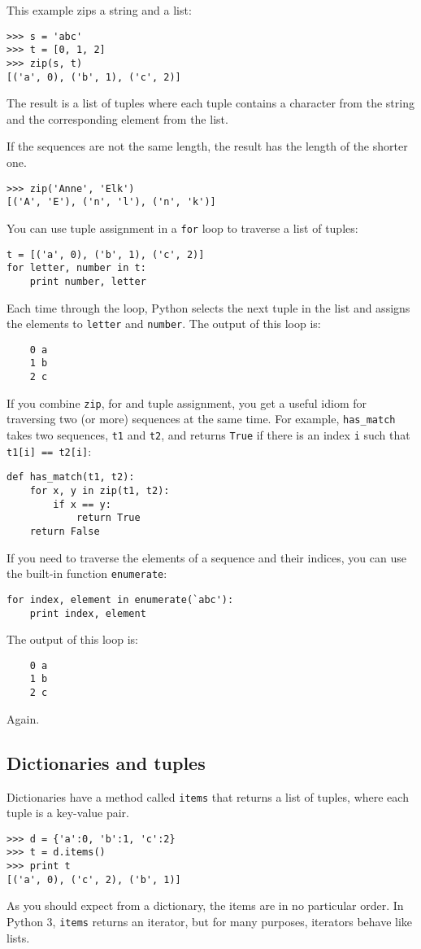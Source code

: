 \documentclass{article}
\begin{document}
This example zips a string and a list:
\begin{verbatim}
>>> s = 'abc'
>>> t = [0, 1, 2]
>>> zip(s, t)
[('a', 0), ('b', 1), ('c', 2)]
\end{verbatim}
The result is a list of tuples where each tuple contains a character
from the string and the corresponding element from the list.

If the sequences are not the same length, the result has the length of
the shorter one.

\begin{verbatim}
>>> zip('Anne', 'Elk')
[('A', 'E'), ('n', 'l'), ('n', 'k')]
\end{verbatim}
You can use tuple assignment in a \verb|for| loop to traverse a list of
tuples:
\begin{verbatim}
t = [('a', 0), ('b', 1), ('c', 2)]
for letter, number in t:
    print number, letter
\end{verbatim}
Each time through the loop, Python selects the next tuple in the
list and assigns the elements to \verb|letter| and \verb|number|.
The output of this loop is:
\begin{verbatim}
    0 a
    1 b
    2 c
\end{verbatim}
If you combine \verb|zip|, for and tuple assignment, you get a useful
idiom for traversing two (or more) sequences at the same time. For
example, \verb|has_match| takes two sequences, \verb|t1| and \verb|t2|,
and returns \verb|True| if there is an index \verb|i| such that
\verb|t1[i] == t2[i]|:
\begin{verbatim}
def has_match(t1, t2):
    for x, y in zip(t1, t2):
        if x == y:
            return True
    return False
\end{verbatim}
If you need to traverse the elements of a sequence and their indices, you
can use the built-in function \verb|enumerate|:
\begin{verbatim}
for index, element in enumerate(`abc'):
    print index, element
\end{verbatim}
The output of this loop is:
\begin{verbatim}
    0 a
    1 b
    2 c
\end{verbatim}
Again.

\subsection{Dictionaries and tuples}
Dictionaries have a method called \verb|items| that returns a list of tuples,
where each tuple is a key-value pair.
\begin{verbatim}
>>> d = {'a':0, 'b':1, 'c':2}
>>> t = d.items()
>>> print t
[('a', 0), ('c', 2), ('b', 1)]
\end{verbatim}
As you should expect from a dictionary, the items are in no particular
order. In Python 3, \verb|items| returns an iterator, but for many purposes,
iterators behave like lists.
\end{document}
